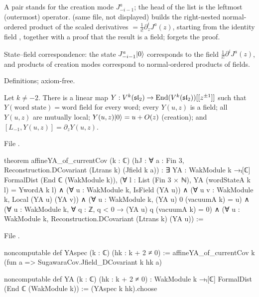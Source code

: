 \begin{dictionary}
A pair  stands for the creation mode $J^a_{-i-1}$; the head of the list is the leftmost
(outermost) operator.  (same file, not displayed) builds the right-nested normal-ordered
product of the scaled derivatives  $=\frac1{i!}\partial_z^iJ^a(z)$, starting from
the identity field , together with a proof that the result is a field; 
forgets the proof.
\end{dictionary}

\begin{physics}
State--field correspondence: the state $J^a_{-i-1}|0\rangle$ corresponds to the field
$\frac1{i!}\partial^iJ^a(z)$, and products of creation modes correspond to normal-ordered products
of fields.
\end{physics}

\begin{status}
Definitions; axiom-free.
\end{status}

\begin{theorem}\label{l08:thm:YA}
Let $k\ne-2$. There is a linear map $Y : V^k(\mathfrak{sl}_2)\to\operatorname{End}(V^k(\mathfrak{sl}_2))[[z^{\pm1}]]$ such that
$Y(\text{word state}) = \text{word field}$ for every word; every $Y(u,z)$ is a field; all $Y(u,z)$ are
mutually local; $Y(u,z)|0\rangle = u + O(z)$ (creation); and $[L_{-1},Y(u,z)] = \partial_zY(u,z)$.
\end{theorem}

\noindent File .
\begin{leancode}
theorem affineYA_of_currentCov (k : ℂ)
    (hJ : ∀ a : Fin 3, Reconstruction.DCovariant (Ltrans k) (Jfield k a)) :
    ∃ YA : WakModule k →ₗ[ℂ] FormalDist (End ℂ (WakModule k)),
      (∀ l : List (Fin 3 × ℕ), YA (wordStateA k l) = YwordA k l) ∧
      (∀ u : WakModule k, IsField (YA u)) ∧
      (∀ u v : WakModule k, Local (YA u) (YA v)) ∧
      (∀ u : WakModule k, (YA u) 0 (vacuumA k) = u) ∧
      (∀ u : WakModule k, ∀ q : ℤ, q < 0 → (YA u) q (vacuumA k) = 0) ∧
      (∀ u : WakModule k, Reconstruction.DCovariant (Ltrans k) (YA u)) :=
\end{leancode}
\noindent File .
\begin{leancode}
noncomputable def YAspec (k : ℂ) (hk : k + 2 ≠ 0) :=
  affineYA_of_currentCov k (fun a => SugawaraCov.Jfield_DCovariant k hk a)

noncomputable def YA (k : ℂ) (hk : k + 2 ≠ 0) :
    WakModule k →ₗ[ℂ] FormalDist (End ℂ (WakModule k)) :=
  (YAspec k hk).choose
\end{leancode}


